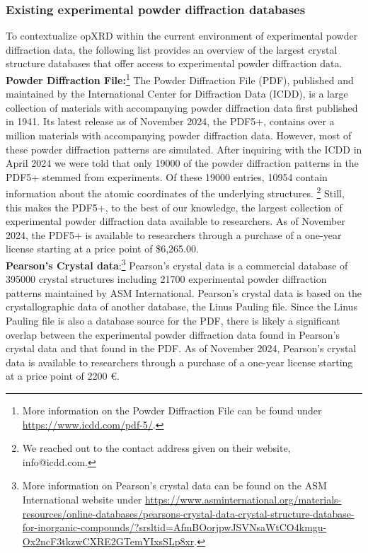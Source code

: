 \pagebreak

\subsubsection*{Existing experimental powder diffraction databases}
To contextualize opXRD within the current environment of experimental powder diffraction data, the following list provides an overview of the largest crystal structure databases that offer access to experimental powder diffraction data. \\

\textbf{Powder Diffraction File:}\footnote{More information on the Powder Diffraction File can be found under \url{https://www.icdd.com/pdf-5/}.} The Powder Diffraction File (PDF), published and maintained by the International Center for Diffraction Data (ICDD), is a large collection of materials with accompanying powder diffraction data first published in 1941\cite{GatesRector2019}. Its latest release as of November 2024, the PDF5+, contains over a million materials with accompanying powder diffraction data. However, most of these powder diffraction patterns are simulated. After inquiring with the ICDD in April 2024 we were told that only 19000 of the powder diffraction patterns in the PDF5+ stemmed from experiments. Of these 19000 entries, 10954 contain information about the atomic coordinates of the underlying structures. \footnote{We reached out to the contact address given on their website, info@icdd.com.} Still, this makes the PDF5+, to the best of our knowledge, the largest collection of experimental powder diffraction data available to researchers. As of November 2024, the PDF5+ is available to researchers through a purchase of a one-year license starting at a price point of \$6,265.00.\\

\textbf{Pearson's Crystal data}:\footnote{More information on Pearson's crystal data can be found on the ASM International website under \url{https://www.asminternational.org/materials-resources/online-databases/pearsons-crystal-data-crystal-structure-database-for-inorganic-compounds/?srsltid=AfmBOorjpwJSVNsaWtCO4kmgu-Ox2ncF3tkzwCXRE2GTemYIxsSLp8xr}.} Pearson's crystal data is a commercial database of 395000 crystal structures including 21700 experimental powder diffraction patterns maintained by ASM International. Pearson's crystal data is based on the crystallographic data of another database, the Linus Pauling file\cite{kaduk2007}. Since the Linus Pauling file is also a database source for the PDF, there is likely a significant overlap between the experimental powder diffraction data found in Pearson's crystal data and that found in the PDF. As of November 2024, Pearson's crystal data is available to researchers through a purchase of a one-year license starting at a price point of 2200 \euro.\\

